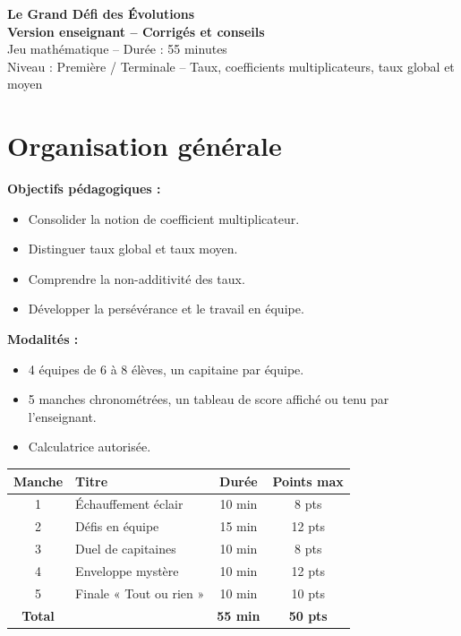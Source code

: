 \documentclass[12pt,a4paper]{article}
\begin{document}
\begin{center}
{\Huge\bfseries\color{bleufonce} Le Grand Défi des Évolutions}\\[0.3cm]
{\Large\bfseries\color{rouge} Version enseignant -- Corrigés et conseils}\\[0.3cm]
{\large Jeu mathématique -- Durée : 55 minutes}\\[0.2cm]
{\large Niveau : Première / Terminale -- Taux, coefficients multiplicateurs, taux global et moyen}
\end{center}

\vspace{0.3cm}

\section*{Organisation générale}

\begin{regle}
\textbf{Objectifs pédagogiques :}
\begin{itemize}
    \item Consolider la notion de coefficient multiplicateur.
    \item Distinguer taux global et taux moyen.
    \item Comprendre la non-additivité des taux.
    \item Développer la persévérance et le travail en équipe.
\end{itemize}
\textbf{Modalités :}
\begin{itemize}
    \item 4 équipes de 6 à 8 élèves, un capitaine par équipe.
    \item 5 manches chronométrées, un tableau de score affiché ou tenu par l'enseignant.
    \item Calculatrice autorisée.
\end{itemize}
\end{regle}

\vspace{0.3cm}

\begin{center}
\renewcommand{\arraystretch}{1.4}
\begin{tabular}{|c|l|c|c|}
\hline
\textbf{Manche} & \textbf{Titre} & \textbf{Durée} & \textbf{Points max} \\
\hline
1 & Échauffement éclair & 10 min & 8 pts \\
\hline
2 & Défis en équipe & 15 min & 12 pts \\
\hline
3 & Duel de capitaines & 10 min & 8 pts \\
\hline
4 & Enveloppe mystère & 10 min & 12 pts \\
\hline
5 & Finale « Tout ou rien » & 10 min & 10 pts \\
\hline
\textbf{Total} & & \textbf{55 min} & \textbf{50 pts} \\
\hline
\end{tabular}
\end{center}
\end{document}
